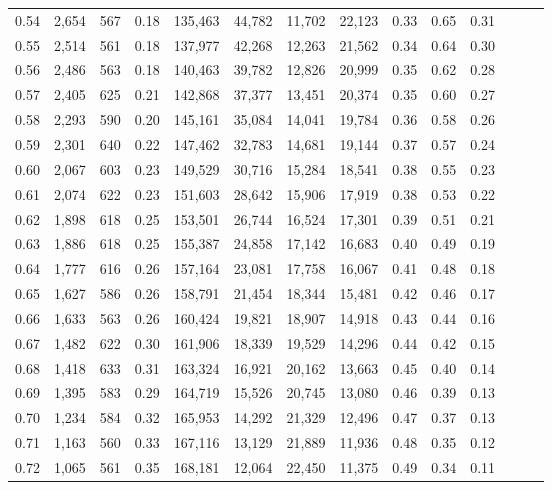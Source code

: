 \begin{tabular}{rrrrrrrrrrrrrr}
0.54 &  2,654 &  567 &  0.18 &  135,463 &   44,782 &  11,702 &  22,123 &  0.33 &  0.65 &      0.31 \\
0.55 &  2,514 &  561 &  0.18 &  137,977 &   42,268 &  12,263 &  21,562 &  0.34 &  0.64 &      0.30 \\
0.56 &  2,486 &  563 &  0.18 &  140,463 &   39,782 &  12,826 &  20,999 &  0.35 &  0.62 &      0.28 \\
0.57 &  2,405 &  625 &  0.21 &  142,868 &   37,377 &  13,451 &  20,374 &  0.35 &  0.60 &      0.27 \\
0.58 &  2,293 &  590 &  0.20 &  145,161 &   35,084 &  14,041 &  19,784 &  0.36 &  0.58 &      0.26 \\
0.59 &  2,301 &  640 &  0.22 &  147,462 &   32,783 &  14,681 &  19,144 &  0.37 &  0.57 &      0.24 \\
0.60 &  2,067 &  603 &  0.23 &  149,529 &   30,716 &  15,284 &  18,541 &  0.38 &  0.55 &      0.23 \\
0.61 &  2,074 &  622 &  0.23 &  151,603 &   28,642 &  15,906 &  17,919 &  0.38 &  0.53 &      0.22 \\
0.62 &  1,898 &  618 &  0.25 &  153,501 &   26,744 &  16,524 &  17,301 &  0.39 &  0.51 &      0.21 \\
0.63 &  1,886 &  618 &  0.25 &  155,387 &   24,858 &  17,142 &  16,683 &  0.40 &  0.49 &      0.19 \\
0.64 &  1,777 &  616 &  0.26 &  157,164 &   23,081 &  17,758 &  16,067 &  0.41 &  0.48 &      0.18 \\
0.65 &  1,627 &  586 &  0.26 &  158,791 &   21,454 &  18,344 &  15,481 &  0.42 &  0.46 &      0.17 \\
0.66 &  1,633 &  563 &  0.26 &  160,424 &   19,821 &  18,907 &  14,918 &  0.43 &  0.44 &      0.16 \\
0.67 &  1,482 &  622 &  0.30 &  161,906 &   18,339 &  19,529 &  14,296 &  0.44 &  0.42 &      0.15 \\
0.68 &  1,418 &  633 &  0.31 &  163,324 &   16,921 &  20,162 &  13,663 &  0.45 &  0.40 &      0.14 \\
0.69 &  1,395 &  583 &  0.29 &  164,719 &   15,526 &  20,745 &  13,080 &  0.46 &  0.39 &      0.13 \\
0.70 &  1,234 &  584 &  0.32 &  165,953 &   14,292 &  21,329 &  12,496 &  0.47 &  0.37 &      0.13 \\
0.71 &  1,163 &  560 &  0.33 &  167,116 &   13,129 &  21,889 &  11,936 &  0.48 &  0.35 &      0.12 \\
0.72 &  1,065 &  561 &  0.35 &  168,181 &   12,064 &  22,450 &  11,375 &  0.49 &  0.34 &      0.11 \\

\end{tabular}
